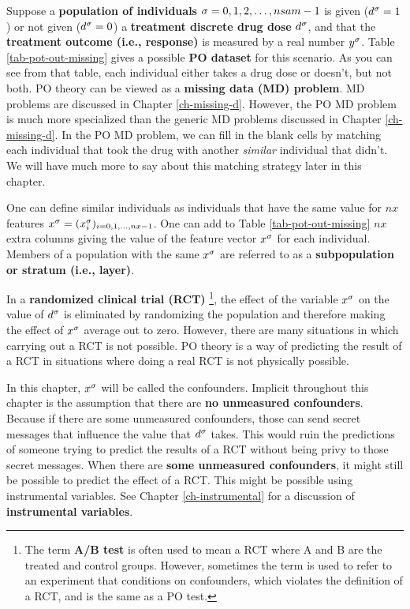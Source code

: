 Suppose a {\bf population
of individuals} $\sigma=0,1,2, \ldots, nsam-1$
is given ($d^\sigma=1$) or
not given ($d^\sigma=0$)
a {\bf treatment discrete drug dose} $d^\sigma$,
and that
the 
 {\bf treatment outcome (i.e., response)}
is measured by
a real number $y^\sigma$.
Table \ref{tab-pot-out-missing}
gives a possible {\bf PO dataset}
for this scenario.
As you
can see from
that table,
each individual 
either takes a drug
dose or
doesn't,
but not both.
PO theory
can be viewed as a
 {\bf  missing
data (MD) problem}. MD problems are 
discussed in
 Chapter \ref{ch-missing-d}.
However, the PO MD problem 
is much more specialized
than the generic MD problems
discussed in Chapter \ref{ch-missing-d}.
In the PO MD
problem, we can
fill
in the blank cells
by matching
each individual
that took
the drug with
another {\it similar} 
individual that didn't.
We will have much
more to say about
this matching
strategy later in this chapter.

One can define
similar
individuals as 
individuals that have the same
value
for $nx$ features $x^\sigma=(x^\sigma_i)_{i=0, 1, \ldots, nx-1}$.
One
can add to Table \ref{tab-pot-out-missing}
 $nx$ extra columns
giving the value of
the feature vector $x^\sigma$
for each individual.
Members
of a population with
the same $x^\sigma$ 
are referred to as 
a
{\bf subpopulation or stratum (i.e., layer)}.

In a {\bf randomized clinical trial (RCT)}
\footnote{The term {\bf A/B test}
is often used to mean a RCT
where A and B are the treated and control groups. However,
sometimes the term is used to refer to 
an experiment  that conditions on confounders,
which violates the definition of a RCT,
and is the same as a PO test.},
the effect 
of the variable $x^\sigma$ on 
the value
of $d^\sigma$
is eliminated by
randomizing
the population
and therefore
making the effect of $x^\sigma$
average out  to zero.
However,
there are many situations
in which carrying out a RCT is not
possible. PO theory is
a way of predicting the
result
of a RCT in situations where
doing a real RCT is not physically possible.

In this chapter, $x^\sigma$
will be called the confounders.
Implicit throughout this chapter
is the assumption that there are {\bf 
no unmeasured confounders}.
Because if 
there are some unmeasured confounders,
those can
send secret messages 
that influence the value 
that $d^\sigma$ takes.
This would ruin
the
predictions
of someone trying
to predict the results of a RCT
without
being privy to those secret 
messages.
When there are {\bf some
unmeasured confounders},
it might still be
possible
to
predict the effect of a RCT.
This might be possible
using instrumental variables. See Chapter
\ref{ch-instrumental}
for a discussion
of {\bf instrumental
variables}.


